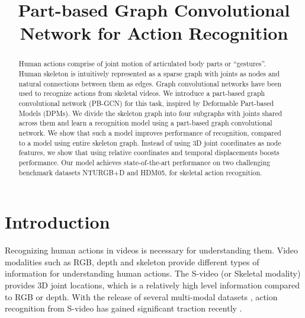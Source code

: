 \documentclass{bmvc2k}
\title{Part-based Graph Convolutional Network for Action Recognition}
\begin{document}
\maketitle

\begin{abstract}
Human actions comprise of joint motion of articulated body parts or ``gestures''. Human skeleton is intuitively represented as a sparse graph with joints as nodes and natural connections between them as edges. Graph convolutional networks have been used to recognize actions from skeletal videos. We introduce a part-based graph convolutional network (PB-GCN) for this task, inspired by Deformable Part-based Models (DPMs). We divide the skeleton graph into four subgraphs with joints shared across them and learn a recognition model using a part-based graph convolutional network. We show that such a model improves performance of recognition, compared to a model using entire skeleton graph. Instead of using 3D joint coordinates as node features, we show that using relative coordinates and temporal displacements boosts performance. Our model achieves state-of-the-art performance on two challenging benchmark datasets NTURGB+D and HDM05, for skeletal action recognition.
\end{abstract}


\section{Introduction}
\label{sec:intro}
Recognizing human actions in videos is necessary for understanding them. Video modalities such as RGB, depth and skeleton provide different types of information for understanding human actions. The S-video (or Skeletal
modality) provides 3D joint locations, which is a relatively high level information compared to RGB or depth. With the release of several multi-modal datasets \cite{Shahroudy_2016_CVPR,liu2017pku,7350781}, action recognition from S-video has gained significant traction recently \cite{liu2016spatio,song2017end,liu2017global,zhang2017geometric,ke2017new}.
\end{document}
